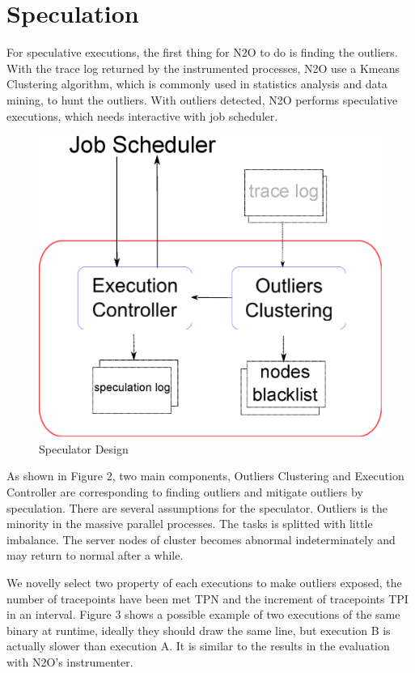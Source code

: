 \section{Speculation}
For speculative executions, the first thing for N2O to do is finding the outliers. With the trace log returned by the instrumented processes, N2O use a Kmeans Clustering algorithm, which is commonly used in statistics analysis and data mining, to hunt the outliers. With outliers detected, N2O performs speculative executions, which needs interactive with job scheduler. 

\begin{figure}
\centering
\includegraphics[width=0.62\columnwidth]{figures/speculator.eps}
\caption{Speculator Design}
\label{figure:speculator}
\end{figure}

As shown in Figure 2, two main components, Outliers Clustering and Execution Controller are corresponding to finding outliers and mitigate outliers by speculation. There are several assumptions for the speculator. Outliers is the minority in the massive parallel processes. The tasks is splitted with little imbalance. The server nodes of cluster becomes abnormal indeterminately and may return to normal after a while.

We novelly select two property of each executions to make outliers exposed, the number of tracepoints have been met TPN and the increment of tracepoints TPI in an interval. Figure 3 shows a possible example of two executions of the same binary at runtime, ideally they should draw the same line, but execution B is actually slower than execution A. It is similar to the results in the evaluation with N2O’s instrumenter. 

